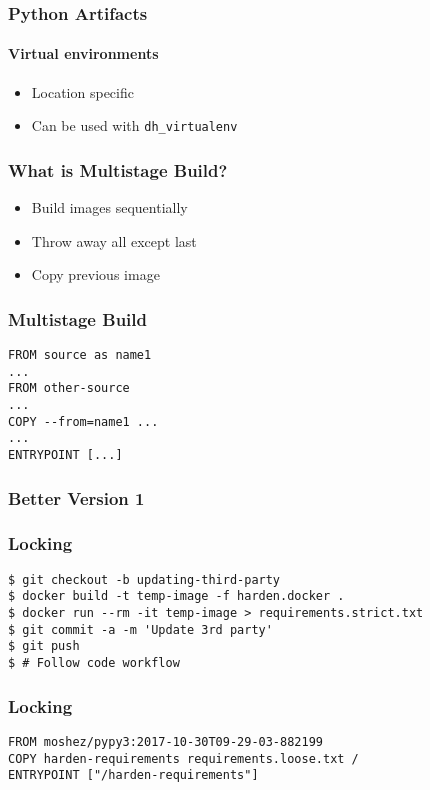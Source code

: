 \documentclass{beamer}
\begin{document}
\begin{frame}[fragile]
\frametitle{Python Artifacts}
\framesubtitle{Virtual environments}
\begin{itemize}
\item Location specific
\item Can be used with \verb|dh_virtualenv|
\end{itemize}
\end{frame}

\begin{frame}[fragile]
\frametitle{What is Multistage Build?}
\begin{itemize}
\item Build images sequentially \pause
\item Throw away all except last \pause
\item Copy previous image
\end{itemize}
\end{frame}

\begin{frame}[fragile]
\frametitle{Multistage Build}
\begin{lstlisting}
FROM source as name1
...
FROM other-source
...
COPY --from=name1 ...
...
ENTRYPOINT [...]
\end{lstlisting}
\end{frame}

\begin{frame}[fragile]
\frametitle{Better Version 1}
\pause
\pause
\pause
\pause

\end{frame}

\begin{frame}[fragile]
\frametitle{Locking}
\begin{lstlisting}
$ git checkout -b updating-third-party
$ docker build -t temp-image -f harden.docker .
$ docker run --rm -it temp-image > requirements.strict.txt
$ git commit -a -m 'Update 3rd party'
$ git push
$ # Follow code workflow
\end{lstlisting}
\end{frame}

\begin{frame}[fragile]
\frametitle{Locking}
\begin{lstlisting}
FROM moshez/pypy3:2017-10-30T09-29-03-882199
COPY harden-requirements requirements.loose.txt /
ENTRYPOINT ["/harden-requirements"]
\end{lstlisting}
\end{frame}
\end{document}
